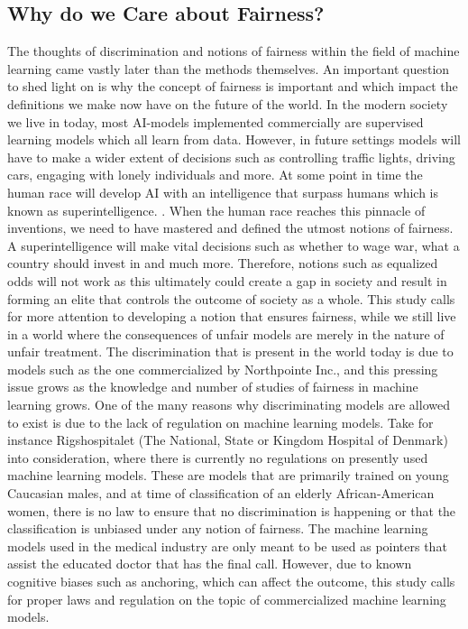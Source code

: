 \documentclass[11pt, fleqn, titlepage]{article}
\begin{document}
	\subsection{Why do we Care about Fairness?}\label{why_do_we_care}
	The thoughts of discrimination and notions of fairness within the field of machine learning came vastly later than the methods themselves. An important question to shed light on is why the concept of fairness is important and which impact the definitions we make now have on the future of the world. In the modern society we live in today, most AI-models implemented commercially are supervised learning models which all learn from data. However, in future settings models will have to make a wider extent of decisions such as controlling traffic lights, driving cars, engaging with lonely individuals and more. At some point in time the human race will develop AI with an intelligence that surpass humans which is known as superintelligence. \cite{superint}. When the human race reaches this pinnacle of inventions, we need to have mastered and defined the utmost notions of fairness. A superintelligence will make vital decisions such as whether to wage war, what a country should invest in and much more. Therefore, notions such as equalized odds will not work as this ultimately could create a gap in society and result in forming an elite that controls the outcome of society as a whole. This study calls for more attention to developing a notion that ensures fairness, while we still live in a world where the consequences of unfair models are merely in the nature of unfair treatment. The discrimination that is present in the world today is due to models such as the one commercialized by Northpointe Inc., and this pressing issue grows as the knowledge and number of studies of fairness in machine learning grows. One of the many reasons why discriminating models are allowed to exist is due to the lack of regulation on machine learning models. Take for instance Rigshospitalet (The National, State or Kingdom Hospital of Denmark) into consideration, where there is currently no regulations on presently used  machine learning models. These are models that are primarily trained on young Caucasian males, and at time of classification of an elderly African-American women, there is no law to ensure that no discrimination is happening or that the classification is unbiased under any notion of fairness. The machine learning models used in the medical industry are only meant to be used as pointers that assist the educated doctor that has the final call. However, due to known cognitive biases such as anchoring, which can affect the outcome, this study calls for proper laws and regulation on the topic of commercialized machine learning models.
\end{document}
